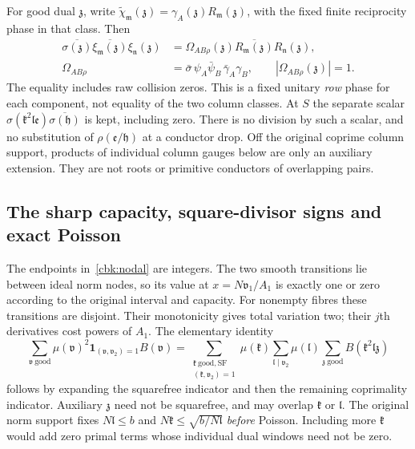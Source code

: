 For good dual $\mathfrak z$, write
$\widetilde\chi_{\mathfrak m}(\mathfrak z)
 =\gamma_A(\mathfrak z)R_{\mathfrak m}(\mathfrak z)$,
with the fixed finite reciprocity phase in that class. Then
\begin{equation}\label{cbk:Omega}
 \begin{aligned}
 \overline{\sigma(\mathfrak z)}
   \overline{\xi_{\mathfrak m}(\mathfrak z)}\xi_{\mathfrak n}(\mathfrak z)
 &=\Omega_{AB\rho}(\mathfrak z)
                  \overline{R_{\mathfrak m}(\mathfrak z)}
                            R_{\mathfrak n}(\mathfrak z),\\
 \Omega_{AB\rho}
 &=\bar\sigma\,\psi_A\bar\psi_B\,\bar\gamma_A\gamma_B,
 \qquad |\Omega_{AB\rho}(\mathfrak z)|=1.
 \end{aligned}
\end{equation}
The equality includes raw collision zeros. This is a fixed unitary
\emph{row} phase for each component, not equality of the two column
classes. At $S$ the separate scalar
$\sigma(\mathfrak k^2\mathfrak l\mathfrak e)
 \overline{\sigma(\mathfrak h)}$ is kept, including zero.
There is no division by such a scalar, and no substitution of
$\rho(\mathfrak e/\mathfrak h)$ at a conductor drop.
Off the original coprime column support, products of individual
column gauges below are only an auxiliary extension. They are not
roots or primitive conductors of overlapping pairs.

\subsection{The sharp capacity, square-divisor signs and exact Poisson}
\label{cbk:kernel-proof}
The endpoints in~\eqref{cbk:nodal} are integers. The two smooth
transitions lie between ideal norm nodes, so its value at
$x=N\mathfrak v_1/A_1$ is exactly one or zero according to the
original interval and capacity. For nonempty fibres these transitions
are disjoint. Their monotonicity gives total variation two; their
$j$th derivatives cost powers of $A_1$.
The elementary identity
\begin{equation}\label{cbk:row-inversion}
 \sum_{\mathfrak v\ \mathrm{good}}\mu(\mathfrak v)^2
                    \mathbf1_{(\mathfrak v,\mathfrak v_2)=1}B(\mathfrak v)
 =\sum_{\substack{\mathfrak k\ \mathrm{good,SF}\\
                    (\mathfrak k,\mathfrak v_2)=1}}\mu(\mathfrak k)
   \sum_{\mathfrak l\mid\mathfrak v_2}\mu(\mathfrak l)
       \sum_{\mathfrak z\ \mathrm{good}}B(\mathfrak k^2\mathfrak l\mathfrak z)
\end{equation}
follows by expanding the squarefree indicator and then the remaining
coprimality indicator. Auxiliary $\mathfrak z$ need not be squarefree,
and may overlap $\mathfrak k$ or $\mathfrak l$. The original norm
support fixes $N\mathfrak l\le b$ and
$N\mathfrak k\le\sqrt{b/N\mathfrak l}$ \emph{before} Poisson.
Including more $\mathfrak k$ would add zero primal terms whose
individual dual windows need not be zero.

